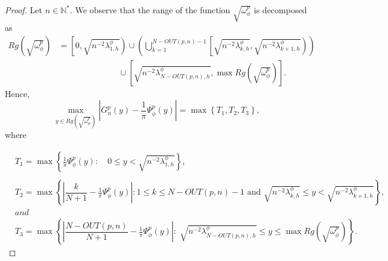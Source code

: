 \documentclass[11pt]{article}
\begin{document}
\begin{proof}
Let $n \in \mathbb{N}^*$. We observe that the range of the function $\sqrt{\omega_\phi^p}$ is decomposed as 
\begin{equation*}
\begin{split}
    Rg\left(\sqrt{\omega_\phi^p}\right)&=\left[0,\sqrt{n^{-2}\lambda_{1,h}^{\phi}}\right)\cup\left(\bigcup_{k=1}^{N-OUT(p,n)-1}\left[\sqrt{n^{-2}\lambda_{k,h}^{\phi}},\sqrt{n^{-2}\lambda_{k+1,h}^{\phi}}\right)\right)\\&\hspace{3cm}\cup\left[\sqrt{n^{-2}\lambda_{N-OUT(p,n),h}^{\phi}},\max Rg\left(\sqrt{\omega_\phi^p}\right)\right].      
\end{split}
\end{equation*}
Hence,
\begin{equation}\label{eq:gedis-1}
\max_{y\in Rg\left(\sqrt{\omega_\phi^p}\right)}\left| G_n^p(y) - \frac{1}{\pi}\Psi^p_{\phi}(y)    \right|=\max \left \{T_1,T_2,T_3 \right\},
\end{equation}
where 

\begin{align*}
& T_1=\max\left\{\frac{1}{\pi}\Psi^p_{\phi}(y): \quad 0\leq y<  \sqrt{n^{-2}\lambda_{1,h}^{\phi} } \right\},\\
&{}\\
& T_2=\max \left\{ \left|\dfrac{k}{N+1}-  \frac{1}{\pi}\Psi^p_{\phi}(y)  \right|:  1 \leq k \leq N-OUT(p,n)-1 \text{ and } \sqrt{n^{-2}\lambda_{k,h}^{\phi}}\leq y < \sqrt{n^{-2}\lambda_{k+1,h}^{\phi}} \right\},\\
&{and}\\
& T_3=\max\left\{\left|\dfrac{N-OUT(p,n)}{N+1} -\frac{1}{\pi}\Psi^p_{\phi}(y)  \right| :\; \sqrt{n^{-2}\lambda_{N-OUT(p,n),h}^{\phi}}\leq y\leq \max Rg\left(\sqrt{\omega_\phi^p}\right)\right\}.
\end{align*}


\end{proof}
\end{document}

